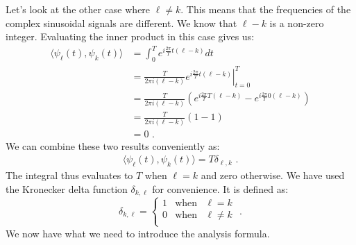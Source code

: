Let's look at the other case where $\ell \ne k$. This means that the frequencies of the complex sinusoidal signals are different. We know that $\ell - k$ is a non-zero integer. Evaluating the inner product in this case gives us:
\begin{align}
\langle \psi_\ell(t), \psi_k(t) \rangle &= \int_0^T  e^{i\frac{2\pi}{T}t(\ell-k)} dt\\
&= \left.\frac{T}{2\pi i (\ell-k)} e^{i\frac{2\pi}{T}t(\ell-k)} \right\vert_{t=0}^{T} \\
&= \frac{T}{2\pi i (\ell-k)}\left( e^{i\frac{2\pi}{T}T(\ell-k)} - e^{i\frac{2\pi}{T}0(\ell-k)} \right)\\
&= \frac{T}{2\pi i (\ell-k)}( 1 - 1 ) \\
&= 0 \,\,.
\end{align}
We can combine these two results conveniently as:
\begin{align}
\langle \psi_\ell(t), \psi_k(t) \rangle = T\delta_{\ell,k} \,\,.
\end{align}
The integral thus evaluates to $T$ when $\ell=k$ and zero otherwise. We have used the Kronecker delta function $\delta_{k,\ell}$ for convenience. It is defined as:
\begin{equation}
\delta_{k,\ell} = \left\{
  \begin{array}{rcr}
    1 & \mathrm{when} & \ell=k \\
    0 & \mathrm{when} & \ell \ne k \\
  \end{array}\right.\,\,.
\end{equation}
We now have what we need to introduce the analysis formula.

